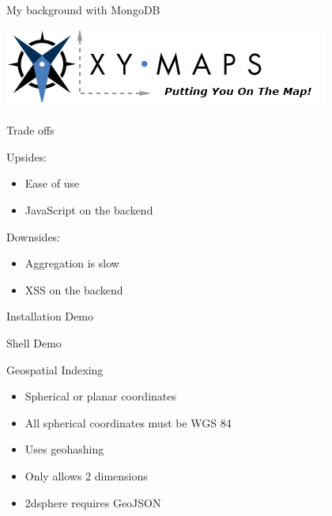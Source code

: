 \documentclass{beamer}
\begin{document}
\begin{frame}{My background with MongoDB}

\begin{center}
\includegraphics[scale=.5]{xy-logo.png}
\end{center}

\end{frame}


\begin{frame}{Trade offs}

Upsides:
\begin{itemize}
\item Ease of use
\item JavaScript on the backend
\end{itemize}

Downsides:
\begin{itemize}
\item Aggregation is slow
\item XSS on the backend
\end{itemize}

\end{frame}


\begin{frame}

\begin{center}
   Installation Demo
\end{center}

\end{frame}


\begin{frame}

\begin{center}
   Shell Demo
\end{center}

\end{frame}


\begin{frame}{Geospatial Indexing}

\begin{itemize}
\item Spherical or planar coordinates
\item All spherical coordinates must be WGS 84
\item Uses geohashing
\item Only allows 2 dimensions
\item 2dsphere requires GeoJSON
\end{itemize}

\end{frame}
\end{document}
